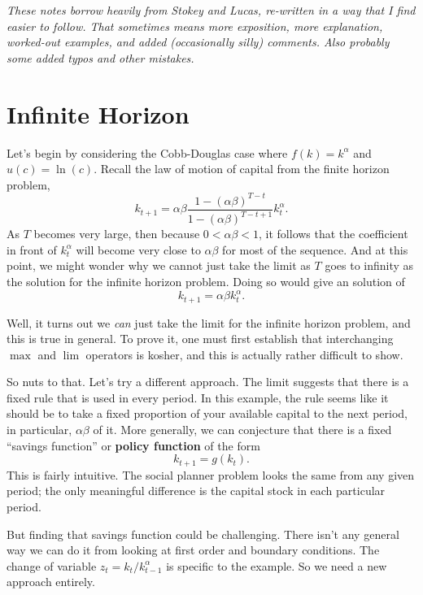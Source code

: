 \documentclass[12pt]{article}
\theoremstyle{definition}
\begin{document}
\maketitle
\singlespace

\noindent \emph{These notes borrow heavily from Stokey and Lucas, re-written in a way that I find easier to follow. That sometimes means more exposition, more explanation, worked-out examples, and added (occasionally silly) comments. Also probably some added typos and other mistakes. }



\section{Infinite Horizon}
Let's begin by considering the Cobb-Douglas case where $f(k)=k^{\alpha}$ and $u(c)=\ln(c)$. Recall the law of motion of capital from the finite horizon problem,
\begin{equation}
	k_{t+1} = \alpha \beta \frac{ 1 - (\alpha \beta)^{T -t}}{ 1 - (\alpha \beta)^{T -t +1}}k^{\alpha}_{t}. \label{cdlomoc} 
\end{equation}
As $T$ becomes very large, then because $0 < \alpha \beta < 1$, it follows that the coefficient in front of $k_t^{\alpha}$ will become very close to $\alpha \beta$ for most of the sequence. And at this point, we might wonder why we cannot just take the limit as $T$ goes to infinity as the solution for the infinite horizon problem. Doing so would give an solution of
	\[k_{t+1} = \alpha \beta k_t^{\alpha}.	\]

Well, it turns out we \emph{can} just take the limit for the infinite horizon problem, and this is true in general. To prove it, one must first establish that  interchanging $\max$ and $\lim$ operators  is kosher, and this is actually rather difficult to show. 

So nuts to that. Let's try a different approach. The limit suggests that there is a fixed rule that is used in every period. In this example, the rule seems like it should be to take a fixed proportion of your available capital to the next period, in particular, $\alpha \beta$ of it. More generally, we can conjecture that there is a fixed ``savings function'' or \textbf{policy function} of the form
	\[	k_{t+1} = g(k_t).	\]
This is fairly intuitive. The social planner problem looks the same from any given period; the only meaningful difference is the capital stock in each particular period. 

But finding that savings function could be challenging. There isn't any general way we can do it from looking at first order and boundary conditions. The change of variable $z_t = k_t / k_{t-1}^{\alpha}$ is specific to the example. So we need a new approach entirely. 
\end{document}
